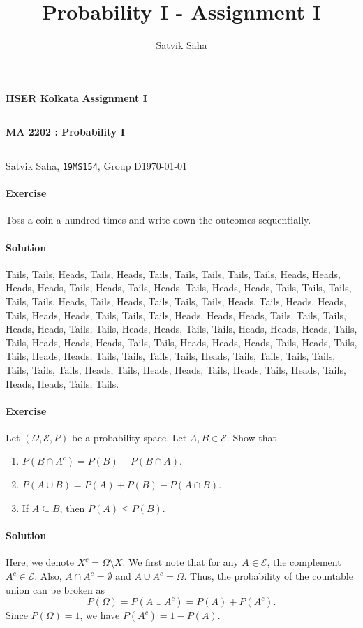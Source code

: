 \documentclass[10pt]{article}
\title{Probability I - Assignment I}
\author{Satvik Saha}
\date{}
\newcounter{prob}
\def\problem{\stepcounter{prob}\paragraph{Exercise \arabic{prob}}}
\def\solution{\paragraph{Solution}}
\begin{document}
        \par\textbf{IISER Kolkata} \hfill \textbf{Assignment I}
        \vspace{3pt}
        \hrule
        \vspace{3pt}
        \begin{center}
                \LARGE{\textbf{MA 2202 : Probability I}}
        \end{center}
        \vspace{3pt}
        \hrule
        \vspace{3pt}
        Satvik Saha, \texttt{19MS154}, Group D\hfill\today
        \vspace{20pt}


        \problem Toss a coin a hundred times and write down the outcomes 
        sequentially.
        \solution Tails, Tails, Heads, Tails, Heads, Tails, Tails, Tails, Tails,
        Tails, Heads, Heads, Heads, Heads, Tails, Heads, Tails, Heads, Tails, Heads,
        Heads, Tails, Tails, Tails, Tails, Tails, Heads, Tails, Heads, Tails, Tails,
        Tails, Heads, Tails, Heads, Heads, Tails, Heads, Heads, Tails, Tails, Tails,
        Heads, Heads, Heads, Tails, Tails, Tails, Heads, Heads, Tails, Tails, Heads,
        Heads, Tails, Tails, Heads, Heads, Heads, Tails, Tails, Heads, Heads, Heads,
        Tails, Tails, Heads, Heads, Heads, Tails, Heads, Tails, Tails, Heads, Heads,
        Tails, Tails, Tails, Tails, Heads, Tails, Tails, Tails, Tails, Tails, Tails,
        Tails, Heads, Tails, Heads, Heads, Tails, Heads, Tails, Heads, Tails, Heads,
        Heads, Tails, Tails.

        \problem Let $(\Omega, \mathcal{E}, P)$ be a probability space.
        Let $A, B \in \mathcal{E}$. Show that
        \begin{enumerate}
                \item $P(B \cap A^c) = P(B) - P(B \cap A)$.
                \item $P(A \cup B) = P(A) + P(B) - P(A \cap B)$.
                \item If $A \subseteq B$, then $P(A) \leq P(B)$.
        \end{enumerate}
        \solution Here, we denote $X^c = \Omega\setminus X$.
        We first note that for any $A \in \mathcal{E}$, the complement $A^c \in
        \mathcal{E}$. Also, $A \cap A^c = \emptyset$ and $A \cup A^c = \Omega$.
        Thus, the probability of the countable union can be broken as \[
                P(\Omega) = P(A \cup A^c) = P(A) + P(A^c).
        \] Since $P(\Omega) = 1$, we have $P(A^c) = 1 - P(A)$. \\
        
\end{document}

